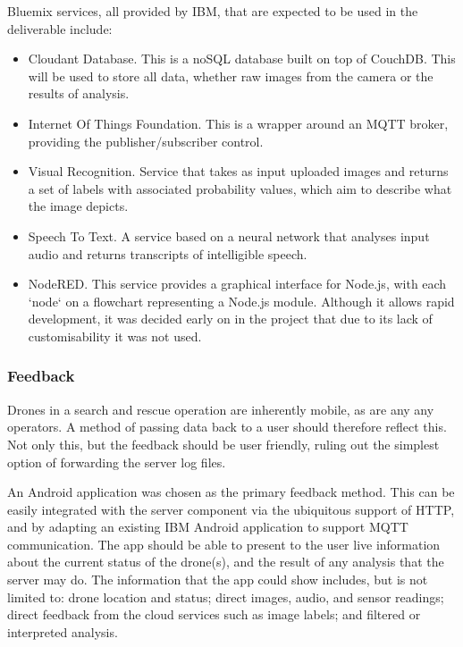 \documentclass{article}
\begin{document}
Bluemix services, all provided by IBM, that are expected to be used in the deliverable include:
\begin{itemize}
    \item Cloudant Database. This is a noSQL database built on top of CouchDB. This will be used to store all data, whether raw images from the camera or the results of analysis.
    \item Internet Of Things Foundation. This is a wrapper around an MQTT broker, providing the publisher/subscriber control.
    \item Visual Recognition. Service that takes as input uploaded images and returns a set of labels with associated probability values, which aim to describe what the image depicts.
    \item Speech To Text. A service based on a neural network that analyses input audio and returns transcripts of intelligible speech.
    \item NodeRED. This service provides a graphical interface for Node.js, with each `node` on a flowchart representing a Node.js module. Although it allows rapid development, it was decided early on in the project that due to its lack of customisability it was not used. 
\end{itemize}


\subsubsection{Feedback}
Drones in a search and rescue operation are inherently mobile, as are any any operators. A method of passing data back to a user should therefore reflect this. Not only this, but the feedback should be user friendly, ruling out the simplest option of forwarding the server log files.

An Android application was chosen as the primary feedback method. This can be easily integrated with the server component via the ubiquitous support of HTTP, and by adapting an existing IBM Android application to support MQTT communication\cite{iotStarterAndroid}. The app should be able to present to the user live information about the current status of the drone(s), and the result of any analysis that the server may do. The information that the app could show includes, but is not limited to: drone location and status; direct images, audio, and sensor readings; direct feedback from the cloud services such as image labels; and filtered or interpreted analysis.
\end{document}
